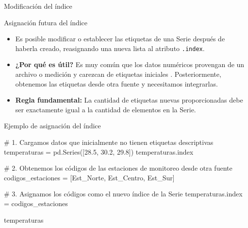 \documentclass[
  ignorenonframetext,
  aspectratio=169,
  spanish,
]{beamer}
\newenvironment{Shaded}{\begin{snugshade}}{\end{snugshade}}
\newcommand{\CommentTok}[1]{\textcolor[rgb]{0.37,0.37,0.37}{#1}}
\newcommand{\FloatTok}[1]{\textcolor[rgb]{0.68,0.00,0.00}{#1}}
\newcommand{\NormalTok}[1]{\textcolor[rgb]{0.00,0.23,0.31}{#1}}
\newcommand{\OperatorTok}[1]{\textcolor[rgb]{0.37,0.37,0.37}{#1}}
\newcommand{\StringTok}[1]{\textcolor[rgb]{0.13,0.47,0.30}{#1}}
\newcommand*\circled[1]{\tikz[baseline=(char.base)]{
          \node[shape=circle,draw,inner sep=1pt] (char) {{\scriptsize#1}};}}
\begin{document}
\begin{frame}[fragile]{Modificación del índice}
\label{modificaciuxf3n-del-uxedndice}
\begin{block}{Asignación futura del índice}
\label{asignaciuxf3n-futura-del-uxedndice}

\begin{itemize}
\item
  Es posible modificar o establecer las etiquetas de una Serie después
  de haberla creado, reasignando una nueva lista al atributo
  \texttt{.index}.
\item
  \textbf{¿Por qué es útil?} Es muy común que los datos numéricos
  provengan de un archivo o medición y carezcan de etiquetas iniciales .
  Posteriormente, obtenemos las etiquetas desde otra fuente y
  necesitamos integrarlas.
\item
  \textbf{Regla fundamental:} La cantidad de etiquetas nuevas
  proporcionadas debe ser exactamente igual a la cantidad de elementos
  en la Serie.
\end{itemize}
\end{block}

\begin{block}{Ejemplo de asignación del índice}
\label{ejemplo-de-asignaciuxf3n-del-uxedndice}
\label{annotated-cell-14}%
\begin{Shaded}
\begin{Highlighting}[]
\CommentTok{\# 1. Cargamos datos que inicialmente no tienen etiquetas descriptivas}
\NormalTok{temperaturas }\OperatorTok{=}\NormalTok{ pd.Series([}\FloatTok{28.5}\NormalTok{, }\FloatTok{30.2}\NormalTok{, }\FloatTok{29.8}\NormalTok{]) }
\NormalTok{temperaturas.index }

\CommentTok{\# 2. Obtenemos los códigos de las estaciones de monitoreo desde otra fuente}
\NormalTok{codigos\_estaciones }\OperatorTok{=}\NormalTok{ [}\StringTok{\textquotesingle{}Est\_Norte\textquotesingle{}}\NormalTok{, }\StringTok{\textquotesingle{}Est\_Centro\textquotesingle{}}\NormalTok{, }\StringTok{\textquotesingle{}Est\_Sur\textquotesingle{}}\NormalTok{]}

\CommentTok{\# 3. Asignamos los códigos como el nuevo índice de la Serie}
\NormalTok{temperaturas.index }\OperatorTok{=}\NormalTok{ codigos\_estaciones }\hspace*{\fill}\NormalTok{\circled{2}}

\NormalTok{temperaturas }\hspace*{\fill}\NormalTok{\circled{3}}
\end{Highlighting}
\end{Shaded}


\end{block}
\end{frame}
\end{document}
